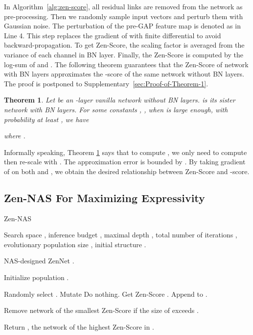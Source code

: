 \documentclass{article}
\newtheorem{thm}{Theorem}
\begin{document}
In Algorithm~\ref{alg:zen-score}, all residual links are removed from the network as pre-processing. Then we randomly sample input vectors and perturb them with Gaussian noise. The perturbation of the pre-GAP feature map is denoted as  in Line 4. This step replaces the gradient of  with finite differential  to avoid backward-propagation. 
To get Zen-Score, the scaling factor  is averaged from the variance of each channel in BN layer. Finally, the Zen-Score is computed by the log-sum of  and . The following theorem guarantees that the Zen-Score of network with BN layers approximates the -score of the same network without BN layers. The proof is postponed to Supplementary~\ref{sec:Proof-of-Theorem-1}.
\begin{thm}
 \label{thm:zen-score-equal-phi-score}
 Let  be an -layer vanilla network without BN layers.  is its sister network with BN layers. For some constants , , when  is large enough, with probability at least , we have
 
where .
\end{thm}

Informally speaking, Theorem \ref{thm:zen-score-equal-phi-score} says that to compute , we only need to compute  then re-scale with . The approximation error is bounded by . By taking gradient of  on both  and , we obtain the desired relationship between Zen-Score and -score.

\subsection{Zen-NAS For Maximizing Expressivity}

\begin{algorithm}
 \caption{Zen-NAS}
 \label{alg:zen-nas}
\begin{algorithmic}[1]

\REQUIRE Search space , inference budget , maximal depth , total number of iterations , evolutionary population size , initial structure .

\ENSURE NAS-designed ZenNet .

\STATE Initialize population .

\FOR{}
\STATE Randomly select .
\STATE Mutate 
 \STATE Do nothing.
\ELSE
 \STATE Get Zen-Score .
 \STATE Append  to .
\ENDIF

\STATE Remove network of the smallest Zen-Score if the size of  exceeds .
\ENDFOR

\STATE Return , the network of the highest Zen-Score in .

\end{algorithmic}
\end{algorithm}
\end{document}
